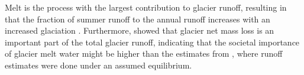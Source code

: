 \documentclass[12pt, a4paper]{article}
\begin{document}
Melt is the process with the largest contribution to glacier runoff, resulting
in that the fraction of summer runoff to the annual runoff increases with an
increased glaciation
\parencite{zappaSeasonalWaterBalance2003,chenInfluenceAlpineGlaciers1990}.
Furthermore, \textcite{blissGlobalResponseGlacier2014} showed that glacier net
mass loss is an important part of the total glacier runoff, indicating that the
societal importance of glacier melt water might be higher than the estimates
from \textcite{kaserContributionPotentialGlaciers2010}, where runoff estimates
were done under an assumed equilibrium.


\end{document}
